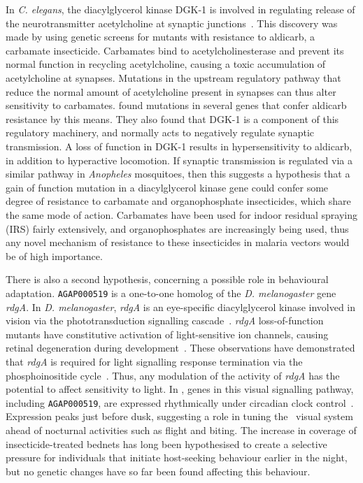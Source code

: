 \documentclass[a4paper,11pt,abstracton,hidelinks]{scrartcl}
\begin{document}
In \textit{C. elegans}, the diacylglycerol kinase DGK-1 is involved in regulating release of the neurotransmitter acetylcholine at synaptic junctions~\parencite{Miller1999}.
%
This discovery was made by using genetic screens for mutants with resistance to aldicarb, a carbamate insecticide.
%
Carbamates bind to acetylcholinesterase and prevent its normal function in recycling acetylcholine, causing a toxic accumulation of acetylcholine at synapses.
%
Mutations in the upstream regulatory pathway that reduce the normal amount of acetylcholine present in synapses can thus alter sensitivity to carbamates.
%
\textcite{Miller1999} found mutations in several genes that confer aldicarb resistance by this means.
%
They also found that DGK-1 is a component of this regulatory machinery, and normally acts to negatively regulate synaptic transmission.
%
A loss of function in DGK-1 results in hypersensitivity to aldicarb, in addition to hyperactive locomotion.
%
If synaptic transmission is regulated via a similar pathway in \textit{Anopheles} mosquitoes, then this suggests a hypothesis that a gain of function mutation in a diacylglycerol kinase gene could confer some degree of resistance to carbamate and organophosphate insecticides, which share the same mode of action.
%
Carbamates have been used for indoor residual spraying (IRS) fairly extensively, and organophosphates are increasingly being used, thus any novel mechanism of resistance to these insecticides in malaria vectors would be of high importance.


There is also a second hypothesis, concerning a possible role in behavioural adaptation.
%
\texttt{AGAP000519} is a one-to-one homolog of the \textit{D. melanogaster} gene \textit{rdgA}.
%
In \textit{D. melanogaster}, \textit{rdgA} is an eye-specific diacylglycerol kinase involved in vision via the phototransduction signalling cascade~\parencite{Masai1993}.
%
\textit{rdgA} loss-of-function mutants have constitutive activation of light-sensitive ion channels, causing retinal degeneration during development~\parencite{Raghu2000}.
%
These observations have demonstrated that \textit{rdgA} is required for light signalling response termination via the phosphoinositide cycle~\parencite{Katz2009}.
%
Thus, any modulation of the activity of \textit{rdgA} has the potential to affect sensitivity to light.
%
In \agam, genes in this visual signalling pathway, including \texttt{AGAP000519}, are expressed rhythmically under circadian clock control~\parencite{Rund2011}.
%
Expression peaks just before dusk, suggesting a role in tuning the \agam\ visual system ahead of nocturnal activities such as flight and biting.
%
The increase in coverage of insecticide-treated bednets has long been hypothesised to create a selective pressure for individuals that initiate host-seeking behaviour earlier in the night, but no genetic changes have so far been found affecting this behaviour.
%
\end{document}
